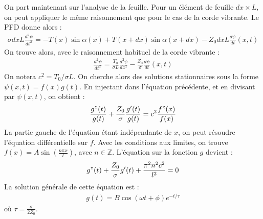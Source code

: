 \begin{correction}
On part maintenant sur l'analyse de la feuille. Pour un élément de feuille $dx\times L$, on peut appliquer le même raisonnement que pour le cas de la corde vibrante. Le PFD donne alors :
\begin{align*}
	\sigma dx  L\frac{d^2\psi}{dt^2}=-T(x)\sin\alpha(x)+T(x+dx)\sin\alpha(x+dx)-Z_0dxL\frac{d\psi}{dt}(x,t)
\end{align*}
On trouve alors, avec le raisonnement habituel de la corde vibrante :
\begin{align*}
	\frac{d^2\psi}{dt^2}=\frac{T_0}{\sigma L}\frac{d^2\psi}{dx^2} -\frac{Z_0}{\sigma}\frac{d\psi}{dt}(x,t)
\end{align*}
On notera $c^2=T_0/\sigma L$. On cherche alors des solutions stationnaires sous la forme $\psi(x,t)=f(x)g(t)$. En injectant dans l'équation précédente, et en divisant par $\psi(x,t)$, on obtient :
\begin{align*}
	\frac{g"(t)}{g(t)}+\frac{Z_0}{\sigma}\frac{g'(t)}{g(t)}=c^2\frac{f"(x)}{f(x)}
\end{align*}
La partie gauche de l'équation étant indépendante de $x$, on peut résoudre l'équation différentielle sur $f$. Avec les conditions aux limites, on trouve $f(x)=A\sin\left(\frac{n\pi x}{l}\right)$, avec $n\in\mathbb{Z}$. L'équation sur la fonction $g$ devient :
\begin{align*}
	g"(t)+\frac{Z_0}{\sigma}g'(t)+\frac{\pi^2n^2c^2}{l^2}=0
\end{align*}
La solution générale de cette équation est :
\begin{align*}
	g(t)=B\cos(\omega t +\phi)e^{-t/\tau}
\end{align*}
où $\tau=\frac{\sigma}{2Z_0}$.

\end{correction}